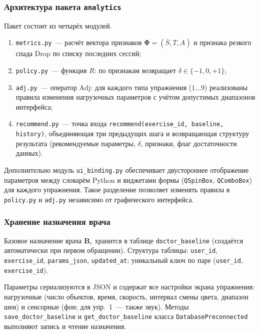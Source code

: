 \subsubsection{Архитектура пакета \texttt{analytics}}

Пакет состоит из четырёх модулей.

\begin{enumerate}
    \item \texttt{metrics.py}~--- расчёт вектора признаков
    $\boldsymbol{\Phi} = (\bar{S}, T, A)$ и признака резкого спада
    $\mathrm{Drop}$ по списку последних сессий;
    \item \texttt{policy.py}~--- функция $R$: по признакам возвращает
    $\delta \in \{-1, 0, +1\}$;
    \item \texttt{adj.py}~--- оператор $\mathrm{Adj}$: для каждого
    типа упражнения ($1 \ldots 9$) реализованы правила изменения
    нагрузочных параметров с учётом допустимых диапазонов интерфейса;
    \item \texttt{recommend.py}~--- точка входа
    \texttt{recommend(exercise\_id, baseline, history)}, объединяющая
    три предыдущих шага и возвращающая структуру результата
    (рекомендуемые параметры, $\delta$, признаки, флаг достаточности
    данных).
\end{enumerate}

Дополнительно модуль \texttt{ui\_binding.py} обеспечивает двустороннее
отображение параметров между словарём Python и виджетами формы
(\texttt{QSpinBox}, \texttt{QComboBox}) для каждого упражнения.
Такое разделение позволяет изменять правила в \texttt{policy.py}
и \texttt{adj.py} независимо от графического интерфейса.

\subsubsection{Хранение назначения врача}

Базовое назначение врача $\mathbf{B}_e$ хранится в таблице
\texttt{doctor\_baseline} (создаётся автоматически при первом
обращении). Структура таблицы:
\texttt{user\_id}, \texttt{exercise\_id}, \texttt{params\_json},
\texttt{updated\_at}; уникальный ключ по паре
(\texttt{user\_id}, \texttt{exercise\_id}).

Параметры сериализуются в JSON и содержат все настройки экрана
упражнения: нагрузочные (число объектов, время, скорость,
интервал смены цвета, диапазон шеи) и сенсорные (фон; для
упр.~1~--- также звук). Методы \texttt{save\_doctor\_baseline} и
\texttt{get\_doctor\_baseline} класса \texttt{DatabasePreconnected}
выполняют запись и чтение назначения.


